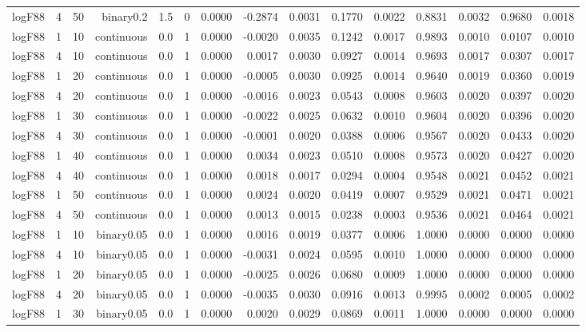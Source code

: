 \begin{longtable}{rrrrrrrrrrrrrrr}
  logF88 & 4 & 50 & binary0.2 & 1.5 & 0 & 0.0000 & -0.2874 & 0.0031 & 0.1770 & 0.0022 & 0.8831 & 0.0032 & 0.9680 & 0.0018 \\ 
  logF88 & 1 & 10 & continuous & 0.0 & 1 & 0.0000 & -0.0020 & 0.0035 & 0.1242 & 0.0017 & 0.9893 & 0.0010 & 0.0107 & 0.0010 \\ 
  logF88 & 4 & 10 & continuous & 0.0 & 1 & 0.0000 & 0.0017 & 0.0030 & 0.0927 & 0.0014 & 0.9693 & 0.0017 & 0.0307 & 0.0017 \\ 
  logF88 & 1 & 20 & continuous & 0.0 & 1 & 0.0000 & -0.0005 & 0.0030 & 0.0925 & 0.0014 & 0.9640 & 0.0019 & 0.0360 & 0.0019 \\ 
  logF88 & 4 & 20 & continuous & 0.0 & 1 & 0.0000 & -0.0016 & 0.0023 & 0.0543 & 0.0008 & 0.9603 & 0.0020 & 0.0397 & 0.0020 \\ 
  logF88 & 1 & 30 & continuous & 0.0 & 1 & 0.0000 & -0.0022 & 0.0025 & 0.0632 & 0.0010 & 0.9604 & 0.0020 & 0.0396 & 0.0020 \\ 
  logF88 & 4 & 30 & continuous & 0.0 & 1 & 0.0000 & -0.0001 & 0.0020 & 0.0388 & 0.0006 & 0.9567 & 0.0020 & 0.0433 & 0.0020 \\ 
  logF88 & 1 & 40 & continuous & 0.0 & 1 & 0.0000 & 0.0034 & 0.0023 & 0.0510 & 0.0008 & 0.9573 & 0.0020 & 0.0427 & 0.0020 \\ 
  logF88 & 4 & 40 & continuous & 0.0 & 1 & 0.0000 & 0.0018 & 0.0017 & 0.0294 & 0.0004 & 0.9548 & 0.0021 & 0.0452 & 0.0021 \\ 
  logF88 & 1 & 50 & continuous & 0.0 & 1 & 0.0000 & 0.0024 & 0.0020 & 0.0419 & 0.0007 & 0.9529 & 0.0021 & 0.0471 & 0.0021 \\ 
  logF88 & 4 & 50 & continuous & 0.0 & 1 & 0.0000 & 0.0013 & 0.0015 & 0.0238 & 0.0003 & 0.9536 & 0.0021 & 0.0464 & 0.0021 \\ 
  logF88 & 1 & 10 & binary0.05 & 0.0 & 1 & 0.0000 & 0.0016 & 0.0019 & 0.0377 & 0.0006 & 1.0000 & 0.0000 & 0.0000 & 0.0000 \\ 
  logF88 & 4 & 10 & binary0.05 & 0.0 & 1 & 0.0000 & -0.0031 & 0.0024 & 0.0595 & 0.0010 & 1.0000 & 0.0000 & 0.0000 & 0.0000 \\ 
  logF88 & 1 & 20 & binary0.05 & 0.0 & 1 & 0.0000 & -0.0025 & 0.0026 & 0.0680 & 0.0009 & 1.0000 & 0.0000 & 0.0000 & 0.0000 \\ 
  logF88 & 4 & 20 & binary0.05 & 0.0 & 1 & 0.0000 & -0.0035 & 0.0030 & 0.0916 & 0.0013 & 0.9995 & 0.0002 & 0.0005 & 0.0002 \\ 
  logF88 & 1 & 30 & binary0.05 & 0.0 & 1 & 0.0000 & 0.0020 & 0.0029 & 0.0869 & 0.0011 & 1.0000 & 0.0000 & 0.0000 & 0.0000 \\ 

\end{longtable}

